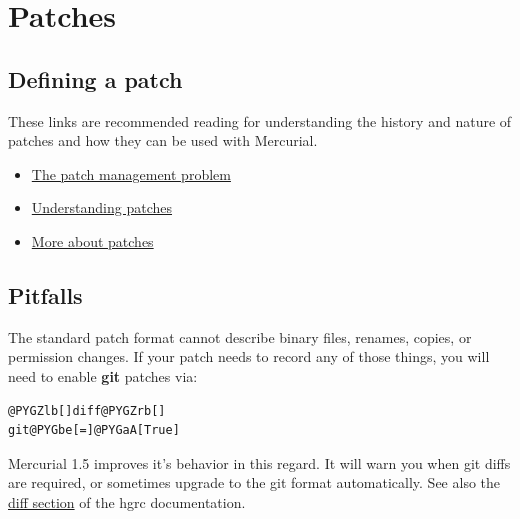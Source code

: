\documentclass[letterpaper,10pt,english]{manual}
\begin{document}
\resetcurrentobjects
\hypertarget{--doc-patches}{}

\chapter{Patches}
\hypertarget{module-patches}{}

\section{Defining a patch}

These links are recommended reading for understanding the history and nature
of patches and how they can be used with Mercurial.
\begin{itemize}
\item {} 
\href{http://tortoisehg.bitbucket.org/hgbook/1.4/managing-change-with-mercurial-queues.html\#sec:mq:patch-mgmt}{The patch management problem}

\item {} 
\href{http://tortoisehg.bitbucket.org/hgbook/1.4/managing-change-with-mercurial-queues.html\#sec:mq:patch}{Understanding patches}

\item {} 
\href{http://tortoisehg.bitbucket.org/hgbook/1.4/managing-change-with-mercurial-queues.html\#sec:mq:adv-patch}{More about patches}

\end{itemize}


\section{Pitfalls}

The standard patch format cannot describe binary files, renames, copies,
or permission changes.  If your patch needs to record any of those
things, you will need to enable \textbf{git} patches via:

\begin{Verbatim}[commandchars=@\[\]]
@PYGZlb[]diff@PYGZrb[]
git@PYGbe[=]@PYGaA[True]
\end{Verbatim}

Mercurial 1.5 improves it's behavior in this regard.  It will warn you
when git diffs are required, or sometimes upgrade to the git format
automatically.  See also the
\href{http://www.selenic.com/mercurial/hgrc.5.html\#diff}{diff section} of
the hgrc documentation.
\end{document}
